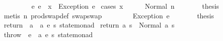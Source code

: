 \begin{isabellebody}
\ \ \ \ \ \ \ \ {\isacharbar}{\kern0pt}\ {\isacharparenleft}{\kern0pt}e{\isacharparenright}{\kern0pt}\ e\ \ {\isachardoublequoteopen}x\ {\isacharequal}{\kern0pt}\ Exception\ e{\isachardoublequoteclose}\isanewline
%
\isadelimproof
%
\endisadelimproof
%
\isatagproof
{}\isamarkupfalse%
\ {\isacharparenleft}{\kern0pt}cases\ x{\isacharparenright}{\kern0pt}\isanewline
\ \ \ \ \isamarkupfalse%
\ {\isacharparenleft}{\kern0pt}Normal\ n{\isacharparenright}{\kern0pt}\isanewline
\ \ \ \ \isamarkupfalse%
\ \isamarkupfalse%
\ {\isacharquery}{\kern0pt}thesis\isanewline
\ \ \ \ \ \ \isamarkupfalse%
\ {\isacharparenleft}{\kern0pt}metis\ n\ prod{\isachardot}{\kern0pt}swap{\isacharunderscore}{\kern0pt}def\ swap{\isacharunderscore}{\kern0pt}swap{\isacharparenright}{\kern0pt}\isanewline
\ \ \isamarkupfalse%
\isanewline
\ \ \ \ \isamarkupfalse%
\ {\isacharparenleft}{\kern0pt}Exception\ e{\isacharparenright}{\kern0pt}\isanewline
\ \ \ \ \isamarkupfalse%
\ \isamarkupfalse%
\ {\isacharquery}{\kern0pt}thesis\ \isacommand{{\isachardot}{\kern0pt}{\isachardot}{\kern0pt}}\isamarkupfalse%
\isanewline
{}\isamarkupfalse%
%
\endisatagproof
{\isafoldproof}%
%
\isadelimproof
%
\endisadelimproof
%
\isadelimdocument
%
\endisadelimdocument
%
\isatagdocument
%
\isamarkuptrue%
%
\endisatagdocument
{\isafolddocument}%
%
\isadelimdocument
%
\endisadelimdocument
{}\isamarkupfalse%
\ return\ {\isacharcolon}{\kern0pt}{\isacharcolon}{\kern0pt}\ {\isachardoublequoteopen}{\isacharprime}{\kern0pt}a\ {\isasymRightarrow}\ {\isacharparenleft}{\kern0pt}{\isacharprime}{\kern0pt}a{\isacharcomma}{\kern0pt}\ {\isacharprime}{\kern0pt}e{\isacharcomma}{\kern0pt}\ {\isacharprime}{\kern0pt}s{\isacharparenright}{\kern0pt}\ state{\isacharunderscore}{\kern0pt}monad{\isachardoublequoteclose}\isanewline
{}\ {\isachardoublequoteopen}return\ a\ s\ {\isacharequal}{\kern0pt}\ Normal\ {\isacharparenleft}{\kern0pt}a{\isacharcomma}{\kern0pt}\ s{\isacharparenright}{\kern0pt}{\isachardoublequoteclose}\isanewline
\isanewline
{}\isamarkupfalse%
\ throw\ {\isacharcolon}{\kern0pt}{\isacharcolon}{\kern0pt}\ {\isachardoublequoteopen}{\isacharprime}{\kern0pt}e\ {\isasymRightarrow}\ {\isacharparenleft}{\kern0pt}{\isacharprime}{\kern0pt}a{\isacharcomma}{\kern0pt}\ {\isacharprime}{\kern0pt}e{\isacharcomma}{\kern0pt}\ {\isacharprime}{\kern0pt}s{\isacharparenright}{\kern0pt}\ state{\isacharunderscore}{\kern0pt}monad{\isachardoublequoteclose}\isanewline

\end{isabellebody}
